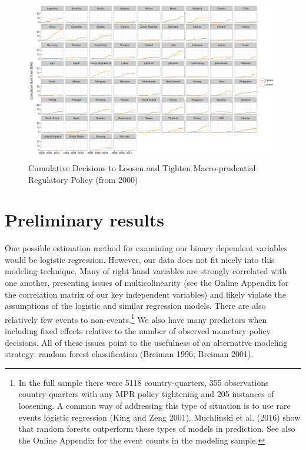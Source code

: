 \documentclass[]{article}
\let\rmarkdownfootnote\footnote%
\def\footnote{\protect\rmarkdownfootnote}
\begin{document}
\begin{landscape}
\begin{figure}
    \caption{Cumulative Decisions to Loosen and Tighten Macro-prudential Regulatory Policy (from 2000)}
    \label{describe_cumsum}
    \begin{center}
        \includegraphics{figures/cumsum_mpr.pdf}
    \end{center}

\end{figure}
\end{landscape}

\section{Preliminary results}\label{preliminary-results}

One possible estimation method for examining our binary dependent
variables would be logistic regression. However, our data does not fit
nicely into this modeling technique. Many of right-hand variables are
strongly correlated with one another, presenting issues of
multicolinearity (see the Online Appendix for the correlation matrix of
our key independent variables) and likely violate the assumptions of the
logistic and similar regression models. There are also relatively few
events to non-events.\footnote{In the full sample there were 5118
  country-quarters, 355 observations country-quarters with any MPR
  policy tightening and 205 instances of loosening. A common way of
  addressing this type of situation is to use rare events logistic
  regression (King and Zeng 2001). Muchlinski et al. (2016) show that
  random forests outperform these types of models in prediction. See
  also the Online Appendix for the event counts in the modeling sample.}
We also have many predictors when including fixed effects relative to
the number of observed monetary policy decisions. All of these issues
point to the usefulness of an alternative modeling strategy: random
forest classification (Breiman 1996; Breiman 2001).
\end{document}
